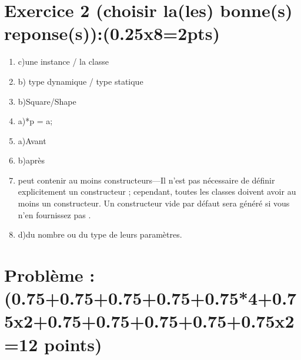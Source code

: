 \documentclass{extarticle}
\begin{document}
\section*{Exercice 2 \scriptsize{(choisir la(les) bonne(s) reponse(s)):(0.25x8=2pts)}}

\begin{enumerate}
      \item c)une instance / la classe
      \item b) type dynamique / type statique
      \item b)Square/Shape
      \item a)*p = a;
      \item a)Avant
      \item b)après
      \item {peut contenir au moins constructeurs---Il n'est pas nécessaire de définir explicitement un constructeur ; cependant, toutes les classes doivent avoir au moins un constructeur. Un constructeur vide par défaut sera généré si vous n'en fournissez pas .}
      \item d)du nombre ou du type de leurs paramètres.
\end{enumerate}

\section*{Problème : \scriptsize{(0.75+0.75+0.75+0.75+0.75*4+0.75x2+0.75+0.75+0.75+0.75+0.75x2=12 points)} }
\end{document}
